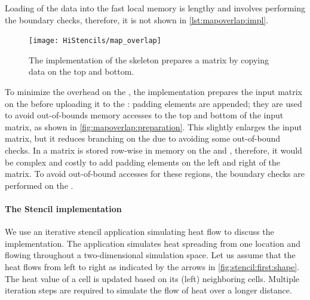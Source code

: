 Loading of the data into the fast local memory is lengthy and involves performing the boundary checks, therefore, it is not shown in \autoref{lst:mapoverlap:impl}.
%
\begin{figure}
  \begin{centering}
    \texttt{[image: HiStencils/map\_overlap]}
    \caption{The  implementation of the \stencil skeleton prepares a matrix by copying data on the top and bottom.}
    \label{fig:mapoverlap:preparation}
    \vspace{-.5em}
  \end{centering}
\end{figure}
%
To minimize the overhead on the \GPU, the  implementation prepares the input matrix on the \CPU before uploading it to the \GPU:
padding elements are appended; they are used to avoid out-of-bounds memory accesses to the top and bottom of the input matrix, as shown in \autoref{fig:mapoverlap:preparation}.
This slightly enlarges the input matrix, but it reduces branching on the \GPU due to avoiding some out-of-bound checks.
In \SkelCL a matrix is stored row-wise in memory on the \CPU and \GPU, therefore, it would be complex and costly to add padding elements on the left and right of the matrix.
To avoid out-of-bound accesses for these regions, the boundary checks are performed on the \GPU.

\paragraph{The Stencil implementation}

We use an iterative stencil application simulating heat flow to discuss the  implementation.
The application simulates heat spreading from one location and flowing throughout a two-dimensional simulation space.
Let us assume that the heat flows from left to right as indicated by the arrows in \autoref{fig:stencil:first:shape}.
The heat value of a cell is updated based on its (left) neighboring cells.
Multiple iteration steps are required to simulate the flow of heat over a longer distance.


